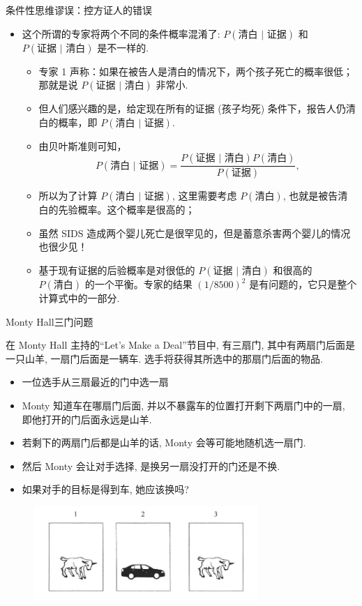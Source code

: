 \begin{frame}{条件性思维谬误：控方证人的错误}
\begin{itemize}[<+-|alert@+>]
\item 这个所谓的专家将两个不同的条件概率混淆了: $P (\mbox{清白 | 证据})$ 和 $P (\mbox{证据 | 清白})$ 是不一样的.
\begin{itemize}[<+-|alert@+>]
\item  专家 1 声称：如果在被告人是清白的情况下，两个孩子死亡的概率很低；那就是说 $P (\mbox{证据 | 清白})$ 非常小.
\item 但人们感兴趣的是，给定现在所有的证据 (孩子均死) 条件下，报告人仍清白的概率，即 $P (\mbox{清白 | 证据})$.
\item 由贝叶斯准则可知，$$P (\mbox{清白 | 证据})=\frac{P (\mbox{证据 | 清白}) P (\mbox{清白})}{P (\mbox{证据})},$$

\item 所以为了计算 $P (\mbox{清白 | 证据})$, 这里需要考虑 $P (\mbox{清白})$, 也就是被告清白的先验概率。这个概率是很高的；
\item 虽然 SIDS 造成两个婴儿死亡是很罕见的，但是蓄意杀害两个婴儿的情况也很少见！
\item 基于现有证据的后验概率是对很低的 $P (\mbox{证据 | 清白})$ 和很高的 $P (\mbox{清白})$ 的一个平衡。专家的结果 $(1/8500)^2$ 是有问题的，它只是整个计算式中的一部分.
\end{itemize}
\end{itemize}
\end{frame}

\begin{frame}{{\rm Monty Hall}三门问题}
	\begin{exam}在 Monty Hall 主持的“Let's Make a Deal”节目中, 有三扇门, 其中有两扇门后面是一只山羊, 一扇门后面是一辆车.  选手将获得其所选中的那扇门后面的物品.
	  \begin{itemize}[<+-|alert@+>]
	  \item 一位选手从三扇最近的门中选一扇
	  \item Monty 知道车在哪扇门后面, 并以不暴露车的位置打开剩下两扇门中的一扇, 即他打开的门后面永远是山羊.
	  \item 若剩下的两扇门后都是山羊的话, Monty 会等可能地随机选一扇门.
	  \item 然后 Monty 会让对手选择, 是换另一扇没打开的门还是不换.
	  \item 如果对手的目标是得到车, 她应该换吗?
	  \end{itemize}

	  \end{exam}
	  \vspace{-0.2cm}
	   \begin{figure}[Monty Hall 问题.png]
		\centering
		\includegraphics[width=8.5cm]{figures/Monty Hall 问题.png}
	  \end{figure}
  \end{frame}

